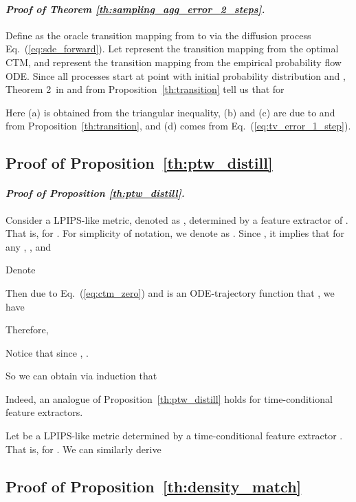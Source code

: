 \documentclass{article} \usepackage{iclr2024_coNFErence,times}
\def\eqref#1{equation~\ref{#1}}
\newenvironment{myproof}[2]{\paragraph{\textit{Proof of {#1} {#2}. }}}{\hfill}
\def\eqref#1{(\ref{#1})}
\def\eqref#1{(\ref{#1})}
\theoremstyle{definition}
\theoremstyle{remark}
\begin{document}
\begin{myproof}{Theorem}{\ref{th:sampling_agg_error_2_steps}}
Define  as the oracle transition mapping from  to  via the diffusion process Eq.~\eqref{eq:sde_forward}. Let  represent the transition mapping from the optimal CTM, and  represent the transition mapping from the empirical probability flow ODE. 
Since all processes start at point  with initial probability distribution  and , Theorem 2~in \citep{chen2022sampling} and  from Proposition~\ref{th:transition} tell us that for 





Here (a) is obtained from the triangular inequality, (b) and (c) are due to  and  from Proposition~\ref{th:transition}, and (d) comes from Eq.~\eqref{eq:tv_error_1_step}.  
    
    

\end{myproof}





\subsection{Proof of Proposition~\ref{th:ptw_distill}}


\begin{myproof}{Proposition}{\ref{th:ptw_distill}} Consider a LPIPS-like metric, denoted as , determined by a feature extractor  of . That is,  for . For simplicity of notation, we denote  as .
    Since , it implies that for any , , and   


Denote 

Then due to Eq.~\eqref{eq:ctm_zero} and  is an ODE-trajectory function that , we have

Therefore, 


Notice that since , .

So we can obtain via induction that 

\end{myproof}

Indeed, an analogue of Proposition~\ref{th:ptw_distill} holds for time-conditional feature extractors.

Let  be a LPIPS-like metric determined by a time-conditional feature extractor . That is,  for . We can similarly derive







\subsection{Proof of Proposition~\ref{th:density_match}}
\end{document}
